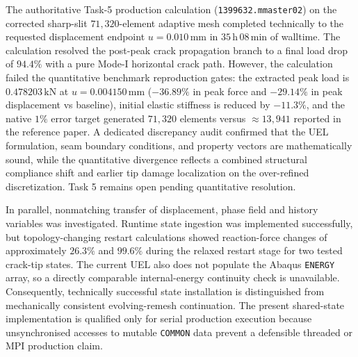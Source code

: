 The authoritative Task-5 production calculation (\texttt{1399632.mmaster02}) on the corrected sharp-slit $71{,}320$-element adaptive mesh completed technically to the requested displacement endpoint $u=0.010\,\mathrm{mm}$ in $35\,\mathrm{h}\,08\,\mathrm{min}$ of walltime. The calculation resolved the post-peak crack propagation branch to a final load drop of $94.4\%$ with a pure Mode-I horizontal crack path. However, the calculation failed the quantitative benchmark reproduction gates: the extracted peak load is $0.478203\,\mathrm{kN}$ at $u=0.004150\,\mathrm{mm}$ ($-36.89\%$ in peak force and $-29.14\%$ in peak displacement vs baseline), initial elastic stiffness is reduced by $-11.3\%$, and the native $1\%$ error target generated $71{,}320$ elements versus $\approx 13{,}941$ reported in the reference paper. A dedicated discrepancy audit confirmed that the UEL formulation, seam boundary conditions, and property vectors are mathematically sound, while the quantitative divergence reflects a combined structural compliance shift and earlier tip damage localization on the over-refined discretization. Task 5 remains open pending quantitative resolution.

In parallel, nonmatching transfer of displacement, phase field and history variables was investigated. Runtime state ingestion was implemented successfully, but topology-changing restart calculations showed reaction-force changes of approximately $26.3\%$ and $99.6\%$ during the relaxed restart stage for two tested crack-tip states. The current UEL also does not populate the Abaqus \texttt{ENERGY} array, so a directly comparable internal-energy continuity check is unavailable. Consequently, technically successful state installation is distinguished from mechanically consistent evolving-remesh continuation. The present shared-state implementation is qualified only for serial production execution because unsynchronised accesses to mutable \texttt{COMMON} data prevent a defensible threaded or MPI production claim.
